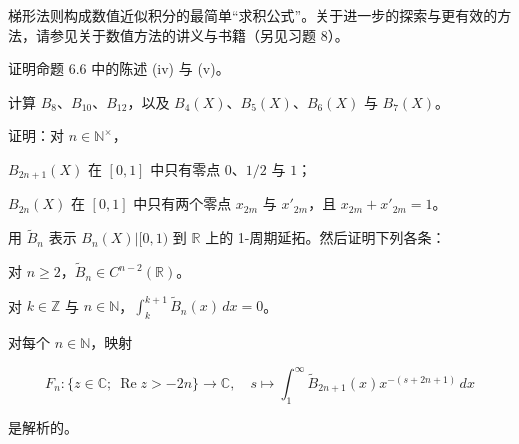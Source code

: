梯形法则构成数值近似积分的最简单“求积公式”。关于进一步的探索与更有效的方法，请参见关于数值方法的讲义与书籍（另见习题 8）。

\exerciseshead

\begin{exercises}
\item

证明命题 6.6 中的陈述 (iv) 与 (v)。

\item

计算 $ B_8 $、$ B_{10} $、$ B_{12} $，以及 $ B_4(X) $、$ B_5(X) $、$ B_6(X) $ 与 $ B_7(X) $。

\item

证明：对 $ n \in \mathbb{N}^\times $，

\begin{subitems}
\item

$ B_{2n+1}(X) $ 在 $ [0, 1] $ 中只有零点 $ 0 $、$ 1/2 $ 与 $ 1 $；

\item

$ B_{2n}(X) $ 在 $ [0, 1] $ 中只有两个零点 $ x_{2m} $ 与 $ x'_{2m} $，且 $ x_{2m} + x'_{2m} = 1 $。

\end{subitems}

\item

用 $ \widetilde{B}_n $ 表示 $ B_n(X)|[0, 1) $ 到 $ \mathbb{R} $ 上的 1-周期延拓。然后证明下列各条：

\begin{subitems}
\item

对 $ n \ge 2 $，$ \widetilde{B}_n \in C^{n-2}(\mathbb{R}) $。

\item

对 $ k \in \mathbb{Z} $ 与 $ n \in \mathbb{N} $，$ \int_k^{k+1} \widetilde{B}_n(x) \, dx = 0 $。

\item

对每个 $ n \in \mathbb{N} $，映射

\[
F_n : \{ z \in \mathbb{C} ; \ \operatorname{Re} z > -2n \} \to \mathbb{C} , \quad s \mapsto \int_{1}^{\infty} \widetilde{B}_{2n+1}(x) x^{-(s+2n+1)} \, dx
\]

是解析的。

\end{subitems}


\end{exercises}
